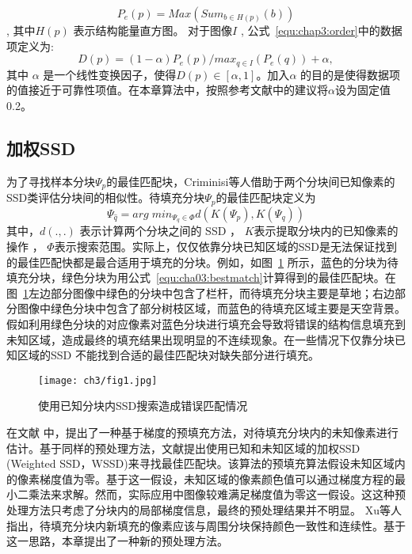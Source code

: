  $$P_e\left(p\right)=Max\left(Sum_{b\in{H\left(p\right)}}\left(b\right)\right)$$, 其中\(H\left(p\right)\) 表示结构能量直方图。 对于图像\(I\) , 公式~\ref{equ:chap3:order}中的数据项定义为:
 $$D(p)=(1-\alpha)P_e(p)/max_{q\in{I}}(P_e(q))+\alpha,$$ 其中 \(\alpha\) 是一个线性变换因子，使得\(D(p)\in{[\alpha,1]}\)。加入\(\alpha\) 的目的是使得数据项的值接近于可靠性项值。在本章算法中，按照参考文献\cite{Xu:2010}中的建议将\(\alpha\)设为固定值0.2。
 \subsection{加权SSD}
 \label{sec:sub:WSSD}
 为了寻找样本分块\(\Psi_p\)的最佳匹配块，Criminisi等人\cite{Criminisi04regionfilling}借助于两个分块间已知像素的SSD类评估分块间的相似性。待填充分块\(\Psi_p\)的最佳匹配块定义为
 \begin{equation}
 \label{equ:cha03:bestmatch}
 \Psi_{\hat{q}}=arg\;min_{\Psi_q\in\Phi}d(K(\Psi_p),K(\Psi_q))
 \end{equation}
 其中，\(d(.,.)\) 表示计算两个分块之间的 SSD ， \(K\)表示提取分块内的已知像素的操作 ， \(\Phi\)表示搜索范围。实际上，仅仅依靠分块已知区域的SSD是无法保证找到的最佳匹配快都是最合适用于填充的分块。例如，如图~\ref{cha03:fig:1} 所示，蓝色的分块为待填充分块，绿色分块为用公式~\ref{equ:cha03:bestmatch}计算得到的最佳匹配块。在图~\ref{cha03:fig:1}左边部分图像中绿色的分块中包含了栏杆，而待填充分块主要是草地；右边部分图像中绿色分块中包含了部分树枝区域，而蓝色的待填充区域主要是天空背景。假如利用绿色分块的对应像素对蓝色分块进行填充会导致将错误的结构信息填充到未知区域，造成最终的填充结果出现明显的不连续现象。在一些情况下仅靠分块已知区域的SSD 不能找到合适的最佳匹配块对缺失部分进行填充。
 \begin{figure}[!htbp]
 	\begin{center}
 			\texttt{[image: ch3/fig1.jpg]}
 	\end{center}
     \caption{使用已知分块内SSD搜索造成错误匹配情况}
 	\label{cha03:fig:1}
 \end{figure}
 在文献 中，提出了一种基于梯度的预填充方法，对待填充分块内的未知像素进行估计。基于同样的预处理方法，文献提出使用已知和未知区域的加权SSD (Weighted SSD，WSSD)来寻找最佳匹配块。该算法的预填充算法假设未知区域内的像素梯度值为零。基于这一假设，未知区域的像素颜色值可以通过梯度方程的最小二乘法来求解。然而，实际应用中图像较难满足梯度值为零这一假设。这这种预处理方法只考虑了分块内的局部梯度信息，最终的预处理结果并不明显。 Xu等人\cite{Xu:2010}指出，待填充分块内新填充的像素应该与周围分块保持颜色一致性和连续性。基于这一思路，本章提出了一种新的预处理方法。
